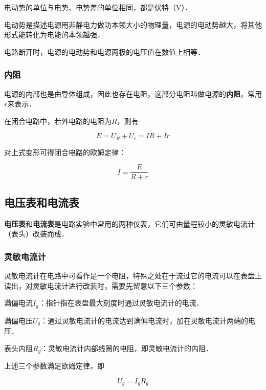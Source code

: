 电动势的单位与电势、电势差的单位相同，都是伏特（$\mathrm{V}$）．

电动势是描述电源用非静电力做功本领大小的物理量，电源的电动势越大，将其他形式能转化为电能的本领越强．

电路断开时，电源的电动势和电源两极的电压值在数值上相等．

\subsubsection{内阻}

电源的内部也是由导体组成，因此也存在电阻，这部分电阻叫做电源的\textbf{内阻}，常用$r$来表示．

在闭合电路中，若外电路的电阻为$R$，则有

\begin{equation}
E=U_R+U_r=IR+Ir
\end{equation}

对上式变形可得闭合电路的欧姆定律：

\begin{equation}
I=\frac{E}{R+r}
\end{equation}

\subsection{电压表和电流表}

\textbf{电压表}和\textbf{电流表}是电路实验中常用的两种仪表，它们可由量程较小的灵敏电流计（表头）改装而成．

\subsubsection{灵敏电流计}

灵敏电流计在电路中可看作是一个电阻，特殊之处在于流过它的电流可以在表盘上读出，对灵敏电流计进行改装时，需要先留意以下三个参数：

满偏电流$I_g$：指针指在表盘最大刻度时通过灵敏电流计的电流．

满偏电压$U_g$：通过灵敏电流计的电流达到满偏电流时，加在灵敏电流计两端的电压．

表头内阻$R_g$：灵敏电流计内部线圈的电阻，即灵敏电流计的内阻．

上述三个参数满足欧姆定律，即

\begin{equation}
U_g=I_g R_g
\end{equation}
